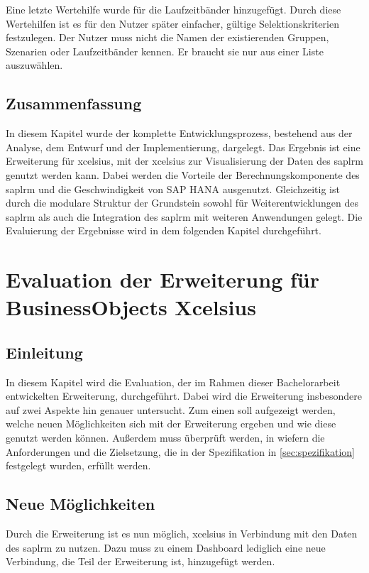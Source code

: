 \begin{onehalfspacing}
Eine letzte Wertehilfe wurde für die Laufzeitbänder hinzugefügt. Durch diese Wertehilfen ist es für den Nutzer später einfacher, gültige Selektionskriterien festzulegen. Der Nutzer muss nicht die Namen der existierenden Gruppen, Szenarien oder Laufzeitbänder kennen. Er braucht sie nur aus einer Liste auszuwählen.

\section{Zusammenfassung}
In diesem Kapitel wurde der komplette Entwicklungsprozess, bestehend aus der Analyse, dem Entwurf und der Implementierung, dargelegt. Das Ergebnis ist eine Erweiterung für \gls{xcelsius}, mit der \gls{xcelsius} zur Visualisierung der Daten des \gls{saplrm} genutzt werden kann. Dabei werden die Vorteile der Berechnungskomponente des \gls{saplrm} und die Geschwindigkeit von SAP HANA ausgenutzt. Gleichzeitig ist durch die modulare Struktur der Grundstein sowohl für Weiterentwicklungen des \gls{saplrm} als auch die Integration des \gls{saplrm} mit weiteren Anwendungen gelegt. Die Evaluierung der Ergebnisse wird in dem folgenden Kapitel durchgeführt.

\chapter{Evaluation der Erweiterung für BusinessObjects Xcelsius}

\section{Einleitung}
In diesem Kapitel wird die Evaluation, der im Rahmen dieser Bachelorarbeit entwickelten Erweiterung, durchgeführt. Dabei wird die Erweiterung insbesondere auf zwei Aspekte hin genauer untersucht. Zum einen soll aufgezeigt werden, welche neuen Möglichkeiten sich mit der Erweiterung ergeben und wie diese genutzt werden können. Außerdem muss überprüft werden, in wiefern die Anforderungen und die Zielsetzung, die in der Spezifikation in \vref{sec:spezifikation} festgelegt wurden, erfüllt werden.

\section{Neue Möglichkeiten}
Durch die Erweiterung ist es nun möglich, \gls{xcelsius} in Verbindung mit den Daten des \gls{saplrm} zu nutzen. Dazu muss zu einem Dashboard lediglich eine neue Verbindung, die Teil der Erweiterung ist, hinzugefügt werden.


\end{onehalfspacing}
